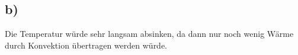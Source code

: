 

\subsection*{b)}
Die Temperatur würde sehr langsam absinken, da dann nur noch wenig Wärme durch Konvektion übertragen werden würde.